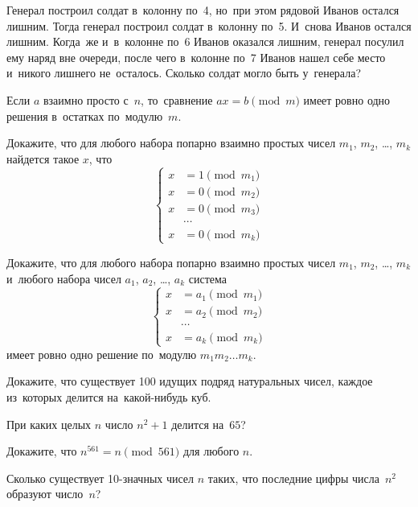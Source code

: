 


\begin{problems}

\item
Генерал построил солдат в~колонну по~4, но~при этом рядовой Иванов остался
лишним.
Тогда генерал построил солдат в~колонну по~5.
И~снова Иванов остался лишним.
Когда~же и~в~колонне по~6 Иванов оказался лишним, генерал посулил ему наряд вне
очереди, после чего в~колонне по~7 Иванов нашел себе место и~никого лишнего
не~осталось.
Сколько солдат могло быть у~генерала?

\item
Если $a$ взаимно просто с~$n$, то~сравнение $a x = b \pmod{m}$ имеет ровно одно
решения в~остатках по~модулю~$m$.

\item
\subproblem
Докажите, что для любого набора попарно взаимно простых чисел
$m_{1}$, $m_{2}$, \ldots, $m_{k}$ найдется такое $x$, что
\[
    \left\{ \begin{aligned}
        x &= 1 \pmod{m_1} \\
        x &= 0 \pmod{m_2} \\
        x &= 0 \pmod{m_3} \\
          & \cdots         \\
        x &= 0 \pmod{m_k}
    \end{aligned} \right.
\]
\par
\subproblem
Докажите, что для любого набора попарно взаимно простых чисел
$m_{1}$, $m_{2}$, \ldots, $m_{k}$ и~любого набора чисел
$a_{1}$, $a_{2}$, \ldots, $a_{k}$ система
\[
    \left\{ \begin{aligned}
        x &= a_{1} \pmod{m_{1}} \\
        x &= a_{2} \pmod{m_{2}} \\
          &  \cdots\\
        x &= a_{k} \pmod{m_{k}}
    \end{aligned} \right.
\]
имеет ровно одно решение по~модулю $m_{1} m_{2} \ldots m_{k}$.

\item
Докажите, что существует 100 идущих подряд натуральных чисел, каждое из~которых
делится на~какой-нибудь куб.

\item
При каких целых $n$ число $n^2 + 1$ делится на~$65$?

\item
Докажите, что $n^{561} = n \pmod{561}$ для любого $n$.

\item
Сколько существует 10-значных чисел $n$ таких, что последние цифры числа~$n^2$
образуют число~$n$?

\end{problems}

